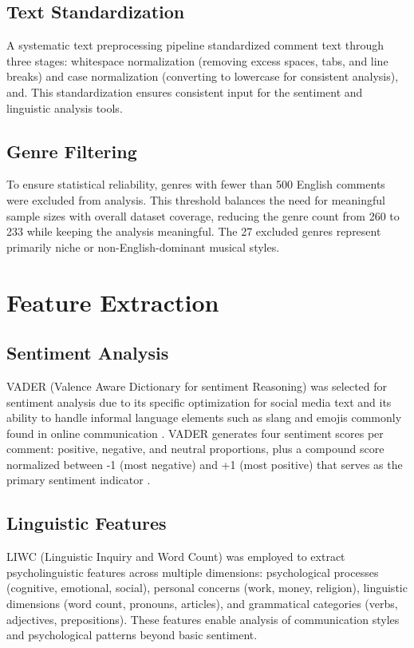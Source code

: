 \subsection{Text Standardization}
A systematic text preprocessing pipeline standardized comment text through three stages: whitespace normalization (removing excess spaces, tabs, and line breaks) and case normalization (converting to lowercase for consistent analysis), and. This standardization ensures consistent input for the sentiment and linguistic analysis tools.

\subsection{Genre Filtering}
To ensure statistical reliability, genres with fewer than 500 English comments were excluded from analysis. This threshold balances the need for meaningful sample sizes with overall dataset coverage, reducing the genre count from 260 to 233 while keeping the analysis meaningful. The 27 excluded genres represent primarily niche or non-English-dominant musical styles.

\section{Feature Extraction}

\subsection{Sentiment Analysis}
VADER (Valence Aware Dictionary for sentiment Reasoning) was selected for sentiment analysis due to its specific optimization for social media text and its ability to handle informal language elements such as slang and emojis commonly found in online communication \cite{hutto2014vader}. VADER generates four sentiment scores per comment: positive, negative, and neutral proportions, plus a compound score normalized between -1 (most negative) and +1 (most positive) that serves as the primary sentiment indicator \cite{Kapoor2024VaderCompound}.

\subsection{Linguistic Features}
LIWC (Linguistic Inquiry and Word Count) was employed to extract psycholinguistic features across multiple dimensions: psychological processes (cognitive, emotional, social), personal concerns (work, money, religion), linguistic dimensions (word count, pronouns, articles), and grammatical categories (verbs, adjectives, prepositions). These features enable analysis of communication styles and psychological patterns beyond basic sentiment.

